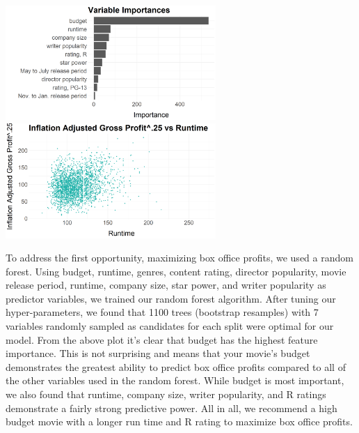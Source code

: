 \documentclass[10pt]{article}
\begin{document}
\begin{center}
\includegraphics[width=8cm]{_assets/predictive_analysis/variable_importance_rf_bop.png}
\hspace{1cm}
\includegraphics[width=8cm]{_assets/_eda/runtime_iagp.png}
\end{center}

\quad To address the first opportunity, maximizing box office profits, we used a random forest. Using budget, runtime, genres, content rating, director popularity, movie release period, runtime, company size, star power, and writer popularity as predictor variables, we trained our random forest algorithm. After tuning our hyper-parameters, we found that 1100 trees (bootstrap resamples) with 7 variables randomly sampled as candidates for each split were optimal for our model. From the above plot it's clear that budget has the highest feature importance. This is not surprising and means that your movie’s budget demonstrates the greatest ability to predict box office profits compared to all of the other variables used in the random forest. While budget is most important, we also found that runtime, company size, writer popularity, and R ratings demonstrate a fairly strong predictive power. All in all, we recommend a high budget movie with a longer run time and R rating to maximize box office profits. 
\end{document}
